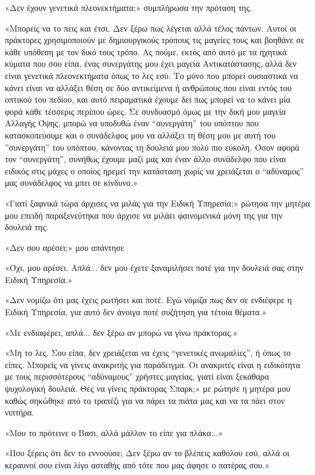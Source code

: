 \documentclass[12pt,twoside, openany]{book}
\begin{document}
«Δεν έχουν γενετικά πλεονεκτήματα;» συμπλήρωσα την πρόταση της.

«Μπορείς να το πεις και έτσι. Δεν ξέρω πως λέγεται αλλά τέλος πάντων. Αυτοί οι πράκτορες χρησιμοποιούν με δημιουργικούς τρόπους τις μαγείες τους και βοηθάνε σε κάθε υπόθεση με τον δικό τους τρόπο. Ας πούμε, εκτός από αυτό με τα ηχητικά κύματα που σου είπα, ένας συνεργάτης μου έχει μαγεία Αντικατάστασης, αλλά δεν είναι γενετικά πλεονεκτήματα όπως το λες εσύ. Το μόνο που μπορεί ουσιαστικά να κάνει είναι να αλλάξει θέση σε δύο αντικείμενα ή ανθρώπους που είναι εντός του οπτικού του πεδίου, και αυτό πειραματικά έχουμε δει πως μπορεί να το κάνει μία φορά κάθε τέσσερις περίπου ώρες. Σε συνδυασμό όμως με την δική μου μαγεία Αλλαγής Όψης, μπορώ να υποδυθώ έναν “συνεργάτη” του υπόπτου που κατασκοπεύουμε και ο συνάδελφος μου να αλλάξει τη θέση μου με αυτή του ”συνεργάτη” του υπόπτου, κάνοντας τη δουλειά μου πολύ πιο εύκολη. Όσον αφορά τον “συνεργάτη”, συνήθως έχουμε μαζί μας και έναν άλλο συνάδελφο που είναι ειδικός στις μάχες ο οποίος ηρεμεί την κατάσταση χωρίς να χρειάζεται ο “αδύναμος” μας συνάδελφος να μπει σε κίνδυνο.»

«Γιατί ξαφνικά τώρα άρχισες να μιλάς για την Ειδική Υπηρεσία;» ρώτησα την μητέρα μου επειδή παραξενεύτηκα που άρχισε να μιλάει φαινομενικά μόνη της για την δουλειά της.

«Δεν σου αρέσει;» μου απάντησε

«Όχι, μου αρέσει. Απλά... δεν μου έχετε ξαναμιλήσει ποτέ για την δουλειά σας στην Ειδική Υπηρεσία.»

«Δεν νομίζω ότι μας έχεις ρωτήσει και ποτέ. Εγώ νόμιζα πως δεν σε ενδιέφερε η Ειδική Υπηρεσία, για αυτό δεν άνοιγα ποτέ συζήτηση για τέτοια θέματα.»

«Με ενδιαφέρει, απλά... δεν ξέρω αν μπορώ να γίνω πράκτορας.»

«Μη το λες. Σου είπα, δεν χρειάζεται να έχεις “γενετικές ανωμαλίες”, ή όπως το είπες. Μπορείς να γίνεις ανακριτής για παράδειγμα. Οι ανακριτές είναι η ειδικότητα με τους περισσότερους “αδύναμους” χρήστες μαγείας, γιατί είναι ξεκάθαρα ψυχολογική δουλειά. Θες να γίνεις πράκτορας Σπαρκ;» με ρώτησε η μητέρα μου καθώς σηκώθηκε από το τραπέζι για να πάρει τα πιάτα μας και να τα πάει στον νιπτήρα. 

«Μου το πρότεινε ο Βασι, αλλά μάλλον το είπε για πλάκα...»

«Που ξέρεις ότι δεν το εννοούσε; Δεν ξέρω αν το βλέπεις καθόλου εσύ, αλλά οι κεραυνοί σου είναι λίγο ασταθής από τότε που μας άφησε ο πατέρας σου.»
\end{document}
